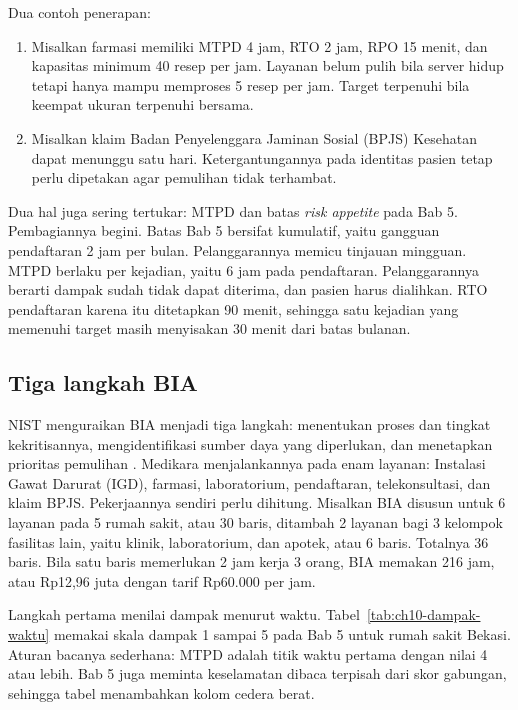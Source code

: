 Dua contoh penerapan:
\begin{enumerate}
  \item Misalkan farmasi memiliki MTPD 4 jam, RTO 2 jam, RPO 15 menit, dan kapasitas minimum 40
  resep per jam. Layanan belum pulih bila server hidup tetapi hanya mampu memproses 5 resep per
  jam. Target terpenuhi bila keempat ukuran terpenuhi bersama.
  \item Misalkan klaim Badan Penyelenggara Jaminan Sosial (BPJS) Kesehatan dapat menunggu satu
  hari. Ketergantungannya pada identitas pasien tetap perlu dipetakan agar pemulihan tidak
  terhambat.
\end{enumerate}

Dua hal juga sering tertukar: MTPD dan batas \textit{risk appetite} pada Bab 5. Pembagiannya
begini. Batas Bab 5 bersifat kumulatif, yaitu gangguan pendaftaran 2 jam per bulan. Pelanggarannya
memicu tinjauan mingguan. MTPD berlaku per kejadian, yaitu 6 jam pada pendaftaran. Pelanggarannya
berarti dampak sudah tidak dapat diterima, dan pasien harus dialihkan. RTO pendaftaran karena itu
ditetapkan 90 menit, sehingga satu kejadian yang memenuhi target masih menyisakan 30 menit dari
batas bulanan.

\subsection*{Tiga langkah BIA}

NIST menguraikan BIA menjadi tiga langkah: menentukan proses dan tingkat kekritisannya,
mengidentifikasi sumber daya yang diperlukan, dan menetapkan prioritas pemulihan
\cite{c10-nist80034}. Medikara menjalankannya pada enam layanan: Instalasi Gawat Darurat (IGD),
farmasi, laboratorium, pendaftaran, telekonsultasi, dan klaim BPJS. Pekerjaannya sendiri perlu
dihitung. Misalkan BIA disusun untuk 6 layanan pada 5 rumah sakit, atau 30 baris, ditambah 2
layanan bagi 3 kelompok fasilitas lain, yaitu klinik, laboratorium, dan apotek, atau 6 baris.
Totalnya 36 baris. Bila satu baris memerlukan 2 jam kerja 3 orang, BIA memakan 216 jam, atau
Rp12,96 juta dengan tarif Rp60.000 per jam.

Langkah pertama menilai dampak menurut waktu. Tabel~\ref{tab:ch10-dampak-waktu} memakai skala
dampak 1 sampai 5 pada Bab 5 untuk rumah sakit Bekasi. Aturan bacanya sederhana: MTPD adalah titik
waktu pertama dengan nilai 4 atau lebih. Bab 5 juga meminta keselamatan dibaca terpisah dari skor
gabungan, sehingga tabel menambahkan kolom cedera berat.

